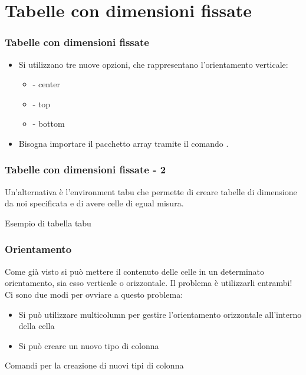 \section{Tabelle con dimensioni fissate}
\begin{frame}[fragile]
  \frametitle{Tabelle con dimensioni fissate}
  \begin{itemize}
    \item<1-> Si utilizzano tre nuove opzioni, che rappresentano l'orientamento verticale:
    \begin{itemize}
      \item {} - center 
      \item {} - top
      \item {} - bottom
    \end{itemize}
   \item<2-> Bisogna importare il pacchetto array tramite il comando \inline{\usepackage{array}}
\texttt{}.
  \end{itemize}

\end{frame}

\begin{frame}[fragile]
  \frametitle{Tabelle con dimensioni fissate - 2}
  Un'alternativa è l'environment tabu che permette di creare tabelle di dimensione da noi specificata e di avere celle di egual misura.\\
  
  \begin{esempio}{Esempio di tabella tabu}
  \end{esempio}

\end{frame}

\begin{frame}[fragile]
  \frametitle{Orientamento}
  Come già visto si può mettere il contenuto delle celle in un determinato orientamento, sia esso verticale o orizzontale. Il problema è utilizzarli entrambi! Ci sono due modi per ovviare a questo problema:
  \begin{itemize}
      \item Si può utilizzare multicolumn per gestire l'orientamento orizzontale all'interno della cella
      \item Si può creare un nuovo tipo di colonna
  \end{itemize}
  
  \begin{esempio}{Comandi per la creazione di nuovi tipi di colonna}
  \end{esempio}

\end{frame}